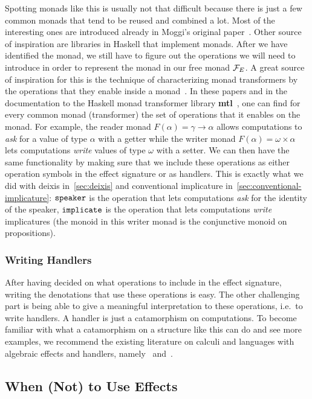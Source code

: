 Spotting monads like this is usually not that difficult because there is
just a few common monads that tend to be reused and combined a lot. Most of
the interesting ones are introduced already in Moggi's original
paper~\cite{moggi1991notions}. Other source of inspiration are libraries in
Haskell that implement monads. After we have identified the monad, we still
have to figure out the operations we will need to introduce in order to
represent the monad in our free monad $\mathcal{F}_E$. A great source of
inspiration for this is the technique of characterizing monad transformers
by the operations that they enable inside a
monad~\cite{jones1995functional,liang1995monad}. In these papers and in the
documentation to the Haskell monad transformer library
\textbf{mtl}~\cite{mtl}, one can find for every common monad (transformer)
the set of operations that it enables on the monad. For example, the reader
monad $F(\alpha) = \gamma \to \alpha$ allows computations to \emph{ask} for
a value of type $\alpha$ with a getter while the writer monad
$F(\alpha) = \omega \times \alpha$ lets computations \emph{write} values of
type $\omega$ with a setter. We can then have the same functionality by
making sure that we include these operations as either operation symbols in
the effect signature or as handlers. This is exactly what we did with
deixis in~\ref{sec:deixis} and conventional implicature
in~\ref{sec:conventional-implicature}: $\mathtt{speaker}$ is the operation
that lets computations \emph{ask} for the identity of the speaker,
$\mathtt{implicate}$ is the operation that lets computations \emph{write}
implicatures (the monoid in this writer monad is the conjunctive monoid on
propositions).


\subsubsection{Writing Handlers}

After having decided on what operations to include in the effect signature,
writing the denotations that use these operations is easy. The other
challenging part is being able to give a meaningful interpretation to these
operations, i.e.\ to write handlers. A handler is just a catamorphism on
computations. To become familiar with what a catamorphism on a structure
like this can do and see more examples, we recommend the existing
literature on calculi and languages with algebraic effects and handlers,
namely~\cite{bauer2012programming} and~\cite{kammar2013handlers}.


\subsection{When (Not) to Use Effects}
\label{ssec:when-to-use-effects}

